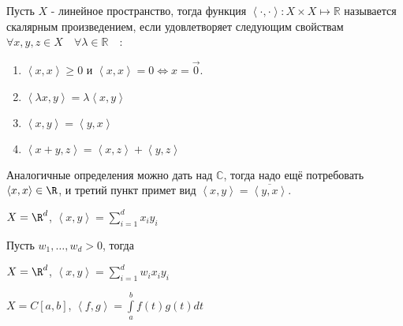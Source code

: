 \begin{definition} \thmslashn 

    Пусть $X$ - линейное пространство, тогда функция $\left<\cdot, \cdot\right> : X \times X \mapsto \mathbb{R}$ называется скалярным произведением, если удовлетворяет следующим свойствам $\forall{x, y, z\in X}\quad \forall{\lambda\in \mathbb{R}}\quad $:

    \begin{enumerate}
        \item $\left<x, x\right> \ge 0$ и $\left<x, x\right> = 0 \iff x = \vec{0}$.
        \item $\left<\lambda x, y\right> = \lambda \left<x, y\right>$
        \item $\left<x, y\right> = \left<y, x\right>$
        \item $\left<x + y, z\right> = \left<x, z\right> + \left<y, z\right>$
    \end{enumerate}
\end{definition}
\begin{remark} \thmslashn

    Аналогичные определения можно дать над $\mathbb{C}$, тогда надо ещё потребовать $\left<x, x\right>\in \R$, и третий пункт примет вид $\left<x, y\right> = \overline{\left<y, x\right>}$.
\end{remark}
\begin{example} \thmslashn

    $X = \R^{d}$, $\left<x, y\right> = \sum\limits_{i=1}^{d} x_{i}y_{i}$
\end{example}
\begin{example} \thmslashn

    Пусть $w_1, \ldots, w_{d} > 0$, тогда 
    
    $X = \R^{d}$, $\left<x, y\right> = \sum\limits_{i=1}^{d} w_{i}x_{i}y_{i}$
\end{example}
\begin{example} \thmslashn

    $X = C[a, b]$,  $\left<f, g\right> = \int\limits_{a}^{b} f(t)g(t)dt $
\end{example}
